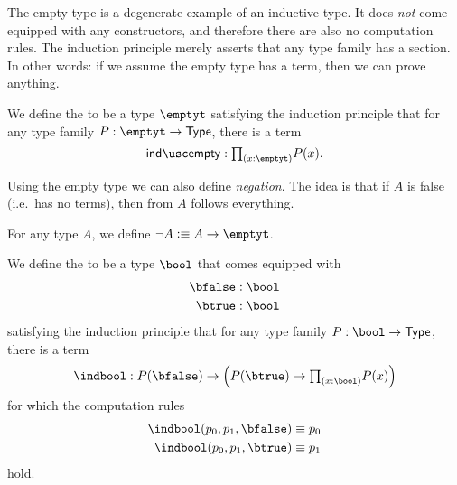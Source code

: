 The empty type is a degenerate example of an inductive type. It does \emph{not} come equipped with any constructors, and therefore there are also no computation rules. The induction principle merely asserts that any type family has a section. In other words: if we assume the empty type has a term, then we can prove anything.

\begin{defn}
We define the  to be a type $\emptyt$ satisfying the induction principle that for any type family $P:\emptyt\to\type$, there is a term
\begin{equation*}
\indempty : \prd{x:\emptyt}P(x).
\end{equation*}
\end{defn}

Using the empty type we can also define \emph{negation}. The idea is that if $A$ is false (i.e.~has no terms), then from $A$ follows everything.

\begin{defn}
For any type $A$, we define $\neg A\defeq A\to \emptyt$.
\end{defn}

\begin{defn}
We define the  to be a type $\bool$ that comes equipped with
\begin{align*}
\bfalse & : \bool \\
\btrue & : \bool
\end{align*}
satisfying the induction principle that for any type family $P:\bool\to\type$, there is a term
\begin{equation*}
\indbool : P(\bfalse)\to \Big(P(\btrue)\to \prd{x:\bool}P(x)\Big)
\end{equation*}
for which the computation rules
\begin{align*}
\indbool(p_0,p_1,\bfalse) & \jdeq p_0 \\
\indbool(p_0,p_1,\btrue) & \jdeq p_1
\end{align*}
hold.
\end{defn}

